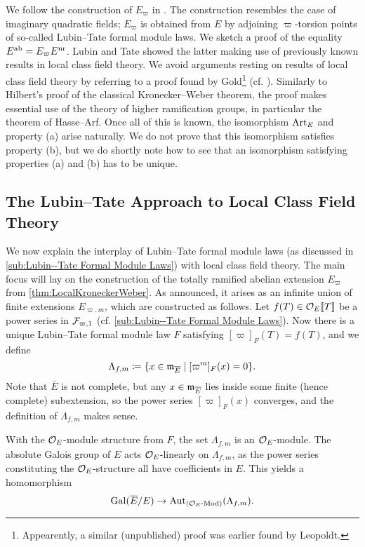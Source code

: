 \documentclass[../main.tex]{subfiles}
\begin{document}
We follow the construction of $E_\varpi$ in \cite{LubinTateFormalMult}.
The construction resembles the case of imaginary quadratic fields; $E_\varpi$ is
obtained from $E$ by adjoining $\varpi$-torsion points of so-called Lubin--Tate
formal module laws. 
We sketch a proof of the equality $E^{\mathrm{ab}} = E_\varpi E^{\mathrm{nr}}$. Lubin and Tate
showed the latter
making use of previously known results in local class field theory.
We avoid arguments resting on results of local class field theory
by referring to a proof found by Gold\footnote{Appearently, a similar
(unpublished) proof was earlier found by Leopoldt.} (cf. \cite{gold1981local}).
Similarly to Hilbert's proof of the classical Kronecker--Weber theorem,
the proof makes essential use of the theory of higher ramification groups,
in particular the theorem of Hasse--Arf. 
Once all of this is known, the isomorphism $\operatorname{Art}_E$ and property
(a) arise naturally. We do not prove that this isomorphism satisfies property
(b), but we do shortly note how to see that an isomorphism satisfying properties
(a) and (b) has to be unique.


\subsection{The Lubin--Tate Approach to Local Class Field Theory} %
\label{sub:Construction of the Maximal Abelian Extension}
We now explain the interplay of Lubin--Tate formal module laws (as discussed
in \cref{sub:Lubin--Tate Formal Module Laws}) with 
local class field theory. The main focus will lay on the construction of the
totally ramified abelian extension $E_\varpi$ from
\cref{thm:LocalKroneckerWeber}. As announced, it 
arises as an infinite union of finite extensions $E_{\varpi, m}$, which
are constructed as follows. Let $f(T) \in \mathcal{O}_E\llbracket T \rrbracket$ be a power series
in $\mathcal{F}_{\varpi,1}$ (cf. \cref{sub:Lubin--Tate Formal Module Laws}). 
Now there is a unique Lubin--Tate formal module law $F$
satisfying $[\varpi]_F(T) = f(T)$, and we define
\begin{equation*}
  \Lambda_{f,m} \coloneqq \{x \in \mathfrak{m}_{\overline E} \mid [\varpi^m]_F(x) = 0\}.
\end{equation*}
Note that $\bar E$ is not complete, but any $x \in \mathfrak{m}_{\overline E}$ lies inside
some finite (hence
complete) subextension, so the power series $[\varpi]_F(x)$ converges, and the 
definition of $\Lambda_{f,m}$ makes sense.

With the $\mathcal{O}_E$-module structure from $F$, the set $\Lambda_{f,m}$ is an
$\mathcal{O}_E$-module. The absolute Galois group of $E$ acts $\mathcal{O}_E$-linearly on
$\Lambda_{f,m}$, as the power series constituting the $\mathcal{O}_E$-structure all
have coefficients in $E$. This yields a homomorphism 
\begin{equation} \label{eq:GaloisGroupToLambdaHom}
  \operatorname{Gal}(\overline E /E ) \to \operatorname{Aut}_{{({\mathcal{O}_E}\textnormal-\allowbreak\mathrm{Mod})}}(\Lambda_{f,m}).
\end{equation}
\end{document}

